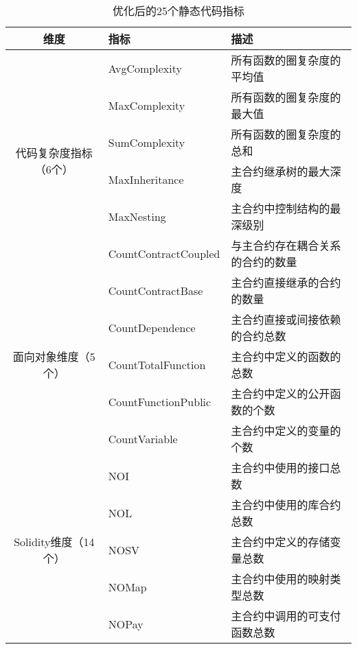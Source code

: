 \begin{table}[htbp]
    \caption{\label{tab:new_metrics}优化后的25个静态代码指标}
    \small
            \renewcommand{\arraystretch}{1.5}
        \begin{tabularx}{\linewidth}{cp{3.5cm}<{\centering}X<{\raggedright}}
            \hline
            \textbf{维度}            & \textbf{指标}              & \textbf{描述} \\ \hline
            \multirow{6}{*}{代码复杂度指标（6个）} & AvgComplexity        & 所有函数的圈复杂度的平均值 \\
                                       & MaxComplexity        & 所有函数的圈复杂度的最大值 \\
                                       & SumComplexity        & 所有函数的圈复杂度的总和 \\
                                       & MaxInheritance   & 主合约继承树的最大深度 \\
                                       & MaxNesting           & 主合约中控制结构的最深级别 \\
                                       & CountContractCoupled  & 与主合约存在耦合关系的合约的数量 \\ \hline
            \multirow{5}{*}{面向对象维度（5个）} & CountContractBase    &  主合约直接继承的合约的数量 \\
                                       & CountDependence      & 主合约直接或间接依赖的合约总数 \\
                                       & CountTotalFunction   & 主合约中定义的函数的总数 \\
                                       & CountFunctionPublic  & 主合约中定义的公开函数的个数 \\
                                       & CountVariable        & 主合约中定义的变量的个数 \\ \hline
            \multirow{14}{*}{Solidity维度（14个）} & NOI                 & 主合约中使用的接口总数 \\
                                       & NOL                & 主合约中使用的库合约总数\\
                                       & NOSV                & 主合约中定义的存储变量总数 \\
                                       & NOMap              & 主合约中使用的映射类型总数 \\
                                       & NOPay               & 主合约中调用的可支付函数总数 \\

\end{tabularx}
\end{table}

